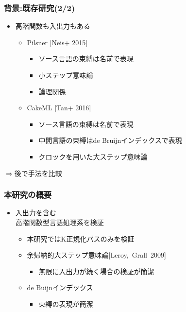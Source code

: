 \documentclass[dvipdfmx,cjk,xcolor=dvipsnames,envcountsect,notheorems,12pt]{beamer}
\theoremstyle{definition}
\begin{document}
\begin{frame}
	\frametitle{背景:既存研究(2/2)}
	\begin{itemize}
		\item 高階関数も入出力もある
			\begin{itemize}
				\item Pilsner [Neis+ 2015]
					\begin{itemize}
						\item ソース言語の束縛は名前で表現
						\item 小ステップ意味論
						\item 論理関係
					\end{itemize}
				\item CakeML [Tan+ 2016]
					\begin{itemize}
						\item ソース言語の束縛は名前で表現
						\item 中間言語の束縛はde Bruijnインデックスで表現
						\item クロックを用いた大ステップ意味論
					\end{itemize}
			\end{itemize}
	\end{itemize}
	\begin{flushright}
		\Large $\Rightarrow$後で手法を比較
	\end{flushright}
\end{frame}

\begin{frame}
	\frametitle{本研究の概要}
	\begin{itemize}
		\item 入出力を含む\\高階関数型言語処理系を検証
			\begin{itemize}
				\item 本研究ではK正規化パスのみを検証
				\item 余帰納的大ステップ意味論\mbox{[Leroy, Grall 2009]}
					\begin{itemize}
						\item 無限に入出力が続く場合の検証が簡潔
					\end{itemize}
				\item de Buijnインデックス
					\begin{itemize}
						\item 束縛の表現が簡潔
					\end{itemize}
			\end{itemize}
	\end{itemize}
\end{frame}
\end{document}
